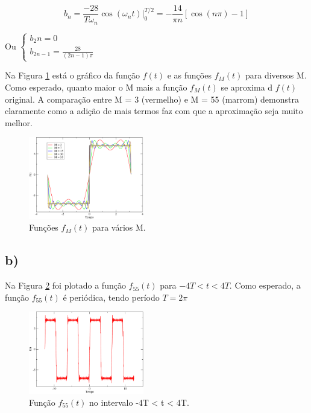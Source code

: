 \documentclass[a4wide]{report}
\begin{document}
\begin{equation}
b_n = \frac{-28}{T \omega_n} \cos(\omega_n t) \bigg|_{0}^{T/2} = -\frac{14}{\pi n} \left[ \cos(n\pi) - 1 \right]
\end{equation}

Ou 
$\begin{cases} 
b_2n = 0 \\ 
b_{2n-1} = \frac{28}{(2n-1) \pi}
\end{cases} $

\vspace{3pt}
Na Figura \ref{a} está o gráfico da função $f(t)$ e as funções $f_{M}(t)$ para diversos M. Como esperado, quanto maior o M mais a função $f_{M}(t)$ se aproxima d $f(t)$ original. A comparação entre M = 3 (vermelho) e M = 55 (marrom) demonstra claramente como a adição de mais termos faz com que a aproximação seja muito melhor.
\begin{figure}[!htb]
\centering
\includegraphics[width=0.447\textwidth]{a.pdf}
\caption{Funções $f_M(t)$ para vários M.}
\label{a}
\end{figure}


\subsection*{b)}

Na Figura \ref{55} foi plotado a função $f_{55}(t)$ para $-4T < t < 4T$. Como esperado, a função $f_{55}(t)$ é periódica, tendo período $ T = 2\pi$
\begin{figure}[!htb]
\centering
\includegraphics[width=0.447\textwidth]{55.pdf}
\caption{Função $f_{55}(t)$ no intervalo -4T < t < 4T.}
\label{55}
\end{figure}
\end{document}
